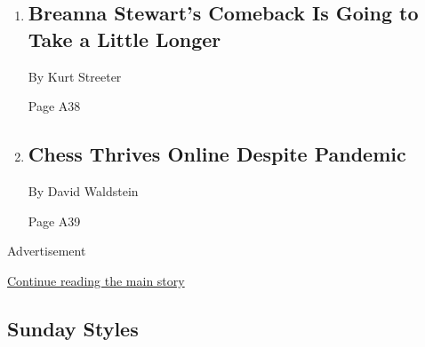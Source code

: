 \begin{enumerate}
\def\labelenumi{\arabic{enumi}.}
\item
  \href{/2020/05/09/sports/basketball/breanna-stewart-wnba-return.html}{}

  \hypertarget{breanna-stewarts-comeback-is-going-to-take-a-little-longer-1}{%
  \subsection{Breanna Stewart's Comeback Is Going to Take a Little
  Longer}\label{breanna-stewarts-comeback-is-going-to-take-a-little-longer-1}}

  By Kurt Streeter

  Page A38
\item
  \href{/2020/05/08/sports/coronavirus-chess-online-tournament.html}{}

  \hypertarget{chess-thrives-online-despite-pandemic}{%
  \subsection{Chess Thrives Online Despite
  Pandemic}\label{chess-thrives-online-despite-pandemic}}

  By David Waldstein

  Page A39
\end{enumerate}

Advertisement

\protect\hyperlink{after-mid7}{Continue reading the main story}

\hypertarget{sunday-styles}{%
\subsection{Sunday Styles}\label{sunday-styles}}

